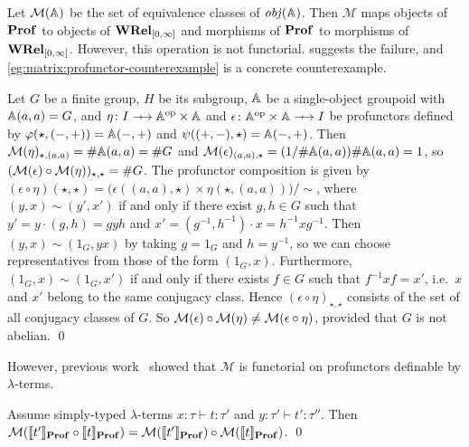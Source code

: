 Let \( \mathcal{M}(\mathbb{A}) \) be the set of equivalence classes of \( \mathit{obj}(\mathbb{A}) \). 
Then \( \mathcal{M} \) maps objects of \( \mathbf{Prof} \) to objects of \( \mathbf{WRel}_{[0,\infty]} \) and morphisms of \( \mathbf{Prof} \) to morphisms of \( \mathbf{WRel}_{[0,\infty]} \).
However, this operation is not functorial.
 suggests the failure, and \cref{eg:matrix:profunctor-counterexample} is a concrete counterexample.


\newcommand{\TerminalCategory}{I}
\begin{example}\label{eg:matrix:profunctor-counterexample}
    Let \( G \) be a finite group, \( H \) be its subgroup, \( \mathbb{A} \) be a single-object groupoid with \( \mathbb{A}(a, a) = G \), and \( \eta \colon \TerminalCategory \profarrow \Grp^{\op} \times \Grp \) and \( \epsilon \colon \Grp^{\op} \times \Grp \profarrow \TerminalCategory \) be profunctors defined by \( \varphi(\star, ({-}, {+})) = \mathbb{A}({-}, {+}) \) and \( \psi(({+}, {-}), \star) = \mathbb{A}({-}, {+}) \).
    Then \( \mathcal{M}({\eta})_{\star, (a,a)} = \#\mathbb{A}(a,a) = \#G \) and \( \mathcal{M}({\epsilon})_{(a,a), \star} = (1/\#\mathbb{A}(a,a))\#\mathbb{A}(a,a) = 1 \), so \( (\mathcal{M}({\epsilon}) \circ \mathcal{M}({\eta}))_{\star, \star} = \#G \).
    The profunctor composition is given by \( (\epsilon \circ \eta)(\star, \star) = \big( \epsilon((a,a), \star) \times \eta(\star, (a,a)) \big) / {\sim} \), where \( (y, x) \sim (y', x') \) if and only if there exist \( g, h \in G \) such that \( y' = y \cdot (g,h) = g y h \) and \( x' = (g^{-1}, h^{-1}) \cdot x = h^{-1} x g^{-1} \).
    Then \( (y, x) \sim (1_G, yx) \) by taking \( g = 1_G \) and \( h = y^{-1} \), so we can choose representatives from those of the form \( (1_G, x) \).
    Furthermore, \( (1_G, x) \sim (1_G, x') \) if and only if there exists \( f \in G \) such that \( f^{-1} x f = x' \), i.e.~\( x \) and \( x' \) belong to the same conjugacy class.
    Hence \( (\epsilon \circ \eta)_{\star, \star} \) consists of the set of all conjugacy classes of \( G \).
    So \( \mathcal{M}({\epsilon}) \circ \mathcal{M}({\eta}) \neq \mathcal{M}({\epsilon \circ \eta}) \), provided that \( G \) is not abelian.
    \qed
\end{example}

However, previous work~\cite{Tsukada2018,Clairambault2024} showed that \( \mathcal{M} \) is functorial on profunctors definable by \( \lambda \)-terms.
\begin{theorem}
    Assume simply-typed \( \lambda \)-terms \( x \colon \tau \vdash t \colon \tau' \) and \( y \colon \tau' \vdash t' \colon \tau'' \).
    Then \( \mathcal{M}({\llbracket{t'}\rrbracket_{\mathbf{Prof}} \circ \llbracket{t}\rrbracket_{\mathbf{Prof}}}) = \mathcal{M}({\llbracket{t'}\rrbracket_{\mathbf{Prof}}}) \circ \mathcal{M}({\llbracket{t}\rrbracket_{\mathbf{Prof}}}) \).
    \qed
\end{theorem}

